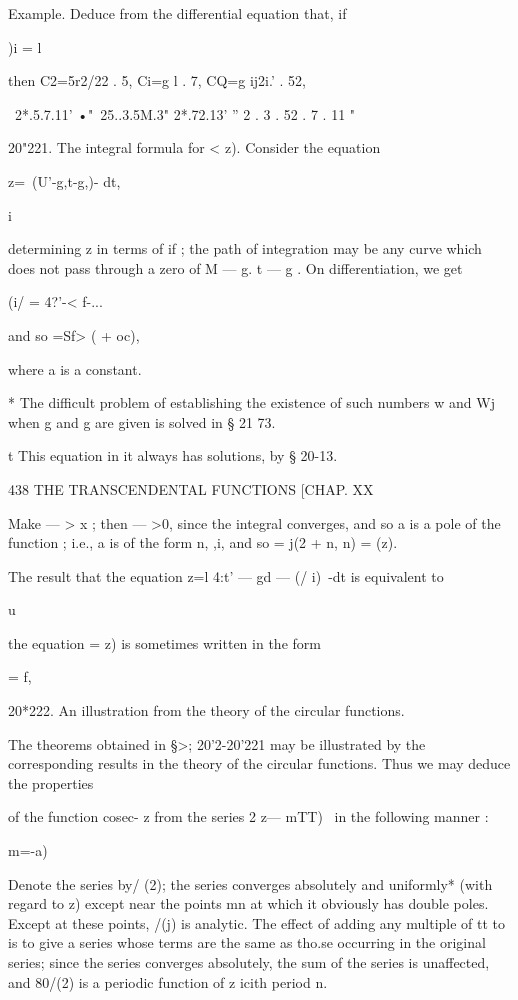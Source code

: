 {Example. Deduce from the differential equation that, if



)i = l



then C2=5r2/22 . 5, Ci=g l . 7, CQ=g ij2i.' . 52,

 ~2*.5.7.11' •"~25..3.5M.3" 2*.72.13' '' 2 . 3 . 52 . 7 . 11 "

20"221. The integral formula for < z). Consider the equation

z=\ (U'-g,t-g,)- dt,

  i

determining z in terms of if ; the path of integration may be any
curve which does not pass through a zero of M — g. t — g . On
differentiation, we get



(i/ = 4?'-< f-...



and so =Sf> ( + oc),

where a is a constant.

* The difficult problem of establishing the existence of such numbers
w and Wj when g and g are given is solved in § 21 73.

t This equation in it always has solutions, by § 20-13.



438 THE TRANSCENDENTAL FUNCTIONS [CHAP. XX

Make — > x ; then — >0, since the integral converges, and so a is a
pole of the function ; i.e., a is of the form n, ,i, and so = j(2 + n,
n) = (z).

The result that the equation z=l 4:t' — gd — (/ i)~-dt is equivalent
to

u

the equation = z) is sometimes written in the form



= f,



20*222. An illustration from the theory of the circular functions.

The theorems obtained in §>; 20'2-20'221 may be illustrated by the
corresponding results in the theory of the circular functions. Thus we
may deduce the properties

of the function cosec- z from the series 2 z— mTT)~ in the following
manner :

m=-a)

Denote the series by/ (2); the series converges absolutely and
uniformly* (with regard to z) except near the points mn at which it
obviously has double poles. Except at these points, /(j) is analytic.
The effect of adding any multiple of tt to is to give a series whose
terms are the same as tho.se occurring in the original series; since
the series converges absolutely, the sum of the series is unaffected,
and 80/(2) is a periodic function of z icith period n.

}
